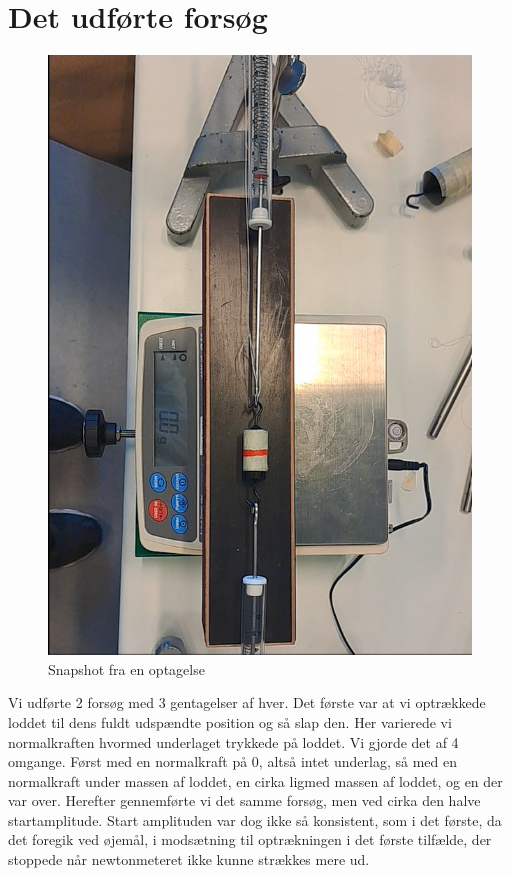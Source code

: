 \section{Det udførte forsøg}
\begin{figure} %
    \centering
    \vspace{-10pt}
    \includegraphics[width=0.7\linewidth, origin=c]{figures/video_eksempel.png}
    \caption{Snapshot fra en optagelse}
    \label{fig:optagelse}
\end{figure}
Vi udførte 2 forsøg med 3 gentagelser af hver. Det første var at vi optrækkede loddet til dens fuldt udspændte position og så slap den. 
Her varierede vi normalkraften hvormed underlaget trykkede på loddet. Vi gjorde det af 4 omgange. Først med en normalkraft på 0, altså intet underlag, så med en normalkraft under massen af loddet, en cirka ligmed massen af loddet, og en der var over.
Herefter gennemførte vi det samme forsøg, men ved cirka den halve startamplitude. Start amplituden var dog ikke så konsistent, som i det første, da det foregik ved øjemål, i modsætning til optrækningen i det første tilfælde, der stoppede når newtonmeteret ikke kunne strækkes mere ud.